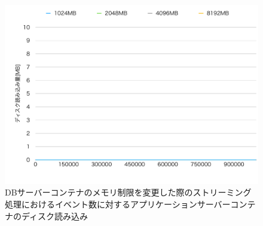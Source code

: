 \documentclass[../../../../../main]{subfiles}
\begin{document}
    \begin{figure}[H]
        \centering
        \includegraphics[width=12cm]{graph}
        \caption{DBサーバーコンテナのメモリ制限を変更した際のストリーミング処理におけるイベント数に対するアプリケーションサーバーコンテナのディスク読み込み}
        \label{fig:stream-change-db-memory-limit-app-disk-out-app_4_8192-db_400}
    \end{figure}
\end{document}
